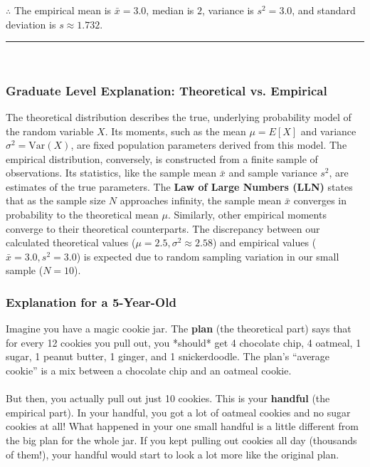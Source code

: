\documentclass{article}
\begin{document}
\subsubsection*{\normalfont}{$\therefore$ The empirical mean is $\bar{x}=3.0$, median is $2$, variance is $s^2=3.0$, and standard deviation is $s \approx 1.732$.}


\noindent\rule{\textwidth}{0.4pt}\\

\newpage

\subsubsection*{\normalfont\bf{Graduate Level Explanation: Theoretical vs. Empirical}}
\parbox{\textwidth}{The theoretical distribution describes the true, underlying probability model of the random variable $X$. Its moments, such as the mean $\mu = E[X]$ and variance $\sigma^2 = \text{Var}(X)$, are fixed population parameters derived from this model. The empirical distribution, conversely, is constructed from a finite sample of observations. Its statistics, like the sample mean $\bar{x}$ and sample variance $s^2$, are estimates of the true parameters. The \textbf{Law of Large Numbers (LLN)} states that as the sample size $N$ approaches infinity, the sample mean $\bar{x}$ converges in probability to the theoretical mean $\mu$. Similarly, other empirical moments converge to their theoretical counterparts. The discrepancy between our calculated theoretical values ($\mu=2.5, \sigma^2 \approx 2.58$) and empirical values ($\bar{x}=3.0, s^2=3.0$) is expected due to random sampling variation in our small sample ($N=10$).}


\subsubsection*{\normalfont\bf{Explanation for a 5-Year-Old}}
\parbox{\textwidth}{Imagine you have a magic cookie jar. The \textbf{plan} (the theoretical part) says that for every 12 cookies you pull out, you *should* get 4 chocolate chip, 4 oatmeal, 1 sugar, 1 peanut butter, 1 ginger, and 1 snickerdoodle. The plan's ``average cookie'' is a mix between a chocolate chip and an oatmeal cookie. \\ \\ But then, you actually pull out just 10 cookies. This is your \textbf{handful} (the empirical part). In your handful, you got a lot of oatmeal cookies and no sugar cookies at all! What happened in your one small handful is a little different from the big plan for the whole jar. If you kept pulling out cookies all day (thousands of them!), your handful would start to look a lot more like the original plan.}
\end{document}
